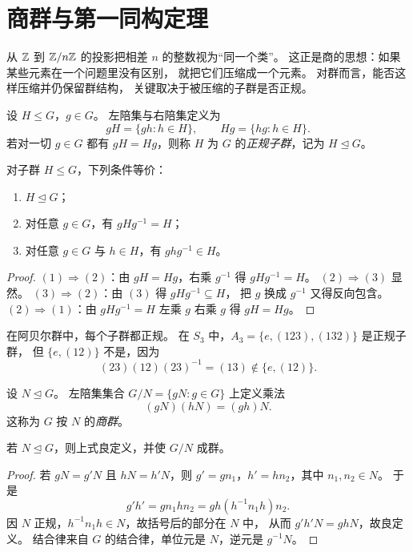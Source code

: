 \section{商群与第一同构定理}
\begin{example}[为什么需要商群]
从 $\mathbb{Z}$ 到 $\mathbb{Z}/n\mathbb{Z}$ 的投影把相差 $n$ 的整数视为“同一个类”。
这正是商的思想：如果某些元素在一个问题里没有区别，
就把它们压缩成一个元素。
对群而言，能否这样压缩并仍保留群结构，
关键取决于被压缩的子群是否正规。
\end{example}
\begin{definition}
设 $H\le G$，$g\in G$。
左陪集与右陪集定义为
\[ gH=\{gh:h\in H\},\qquad Hg=\{hg:h\in H\}. \]
若对一切 $g\in G$ 都有 $gH=Hg$，则称 $H$ 为 $G$ 的\emph{正规子群}，记为 $H\trianglelefteq G$。
\end{definition}
\begin{proposition}
对子群 $H\le G$，下列条件等价：
\begin{enumerate}[label=\textnormal{(\arabic*)}, leftmargin=3em]
  \item $H\trianglelefteq G$；
  \item 对任意 $g\in G$，有 $gHg^{-1}=H$；
  \item 对任意 $g\in G$ 与 $h\in H$，有 $ghg^{-1}\in H$。
\end{enumerate}
\end{proposition}
\begin{proof}
$(1)\Rightarrow(2)$：由 $gH=Hg$，右乘 $g^{-1}$ 得 $gHg^{-1}=H$。
$(2)\Rightarrow(3)$ 显然。
$(3)\Rightarrow(2)$：由 $(3)$ 得 $gHg^{-1}\subseteq H$，
把 $g$ 换成 $g^{-1}$ 又得反向包含。
$(2)\Rightarrow(1)$：由 $gHg^{-1}=H$ 左乘 $g$ 右乘 $g$ 得 $gH=Hg$。
\end{proof}
\begin{example}
在阿贝尔群中，每个子群都正规。
在 $S_3$ 中，$A_3=\{e,(123),(132)\}$ 是正规子群，
但 $\{e,(12)\}$ 不是，因为
\[ (23)(12)(23)^{-1}=(13)\notin \{e,(12)\}. \]
\end{example}
\begin{definition}
设 $N\trianglelefteq G$。
左陪集集合 $G/N=\{gN:g\in G\}$ 上定义乘法
\[ (gN)(hN)=(gh)N. \]
这称为 $G$ 按 $N$ 的\emph{商群}。
\end{definition}
\begin{proposition}
若 $N\trianglelefteq G$，则上式良定义，并使 $G/N$ 成群。
\end{proposition}
\begin{proof}
若 $gN=g'N$ 且 $hN=h'N$，则 $g'=gn_1$，$h'=hn_2$，其中 $n_1,n_2\in N$。
于是
\[ g'h'=gn_1hn_2=gh(h^{-1}n_1h)n_2. \]
因 $N$ 正规，$h^{-1}n_1h\in N$，故括号后的部分在 $N$ 中，
从而 $g'h'N=ghN$，故良定义。
结合律来自 $G$ 的结合律，单位元是 $N$，逆元是 $g^{-1}N$。
\end{proof}
